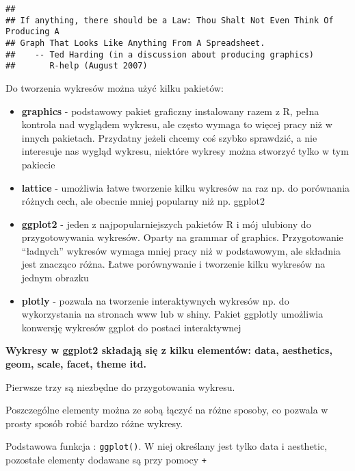 \documentclass[
]{book}
\begin{document}
\begin{verbatim}
## 
## If anything, there should be a Law: Thou Shalt Not Even Think Of Producing A
## Graph That Looks Like Anything From A Spreadsheet.
##    -- Ted Harding (in a discussion about producing graphics)
##       R-help (August 2007)
\end{verbatim}

Do tworzenia wykresów można użyć kilku pakietów:

\begin{itemize}
\item
  \textbf{graphics} - podstawowy pakiet graficzny instalowany razem z R, pełna kontrola nad wyglądem wykresu, ale często wymaga to więcej pracy niż w innych pakietach. Przydatny jeżeli chcemy coś szybko sprawdzić, a nie interesuje nas wygląd wykresu, niektóre wykresy można stworzyć tylko w tym pakiecie
\item
  \textbf{lattice} - umożliwia łatwe tworzenie kilku wykresów na raz np. do porównania różnych cech, ale obecnie mniej popularny niż np. ggplot2
\item
  \textbf{ggplot2} - jeden z najpopularniejszych pakietów R i mój ulubiony do przygotowywania wykresów. Oparty na grammar of graphics. Przygotowanie ``ładnych'' wykresów wymaga mniej pracy niż w podstawowym, ale składnia jest znacząco różna. Łatwe porównywanie i tworzenie kilku wykresów na jednym obrazku
\item
  \textbf{plotly} - pozwala na tworzenie interaktywnych wykresów np. do wykorzystania na stronach www lub w shiny. Pakiet ggplotly umożliwia konwersję wykresów ggplot do postaci interaktywnej
\end{itemize}

\textbf{Wykresy w ggplot2 składają się z kilku elementów: data, aesthetics, geom, scale, facet, theme itd.}

Pierwsze trzy są niezbędne do przygotowania wykresu.

Poszczególne elementy można ze sobą łączyć na różne sposoby, co pozwala w prosty sposób robić bardzo różne wykresy.

Podstawowa funkcja : \texttt{ggplot()}. W niej określany jest tylko data i aesthetic, pozostałe elementy dodawane są przy pomocy \texttt{+}
\end{document}
